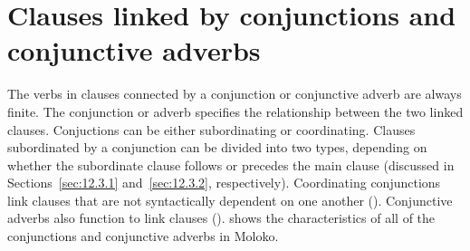 \section{Clauses linked by conjunctions and conjunctive adverbs}\label{sec:12.3}
\hypertarget{RefHeading1213421525720847}{}
The verbs in clauses connected by a conjunction or conjunctive adverb are always finite. The conjunction or adverb specifies the relationship between the two linked clauses. Conjuctions can be either subordinating or coordinating. Clauses subordinated by a conjunction can be divided into two types, depending on whether the subordinate clause follows or precedes the main clause (discussed in Sections~\ref{sec:12.3.1} and~\ref{sec:12.3.2}, respectively). Coordinating conjunctions link clauses that are not syntactically dependent on one another (). Conjunctive adverbs also function to link clauses ().  shows the characteristics of all of the conjunctions and conjunctive adverbs in Moloko.

